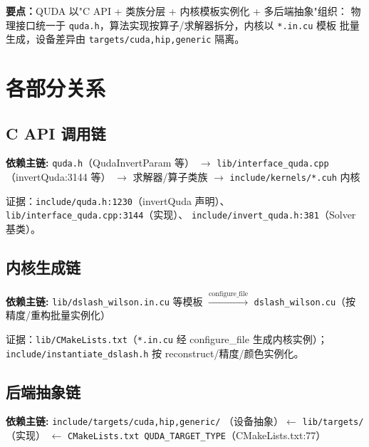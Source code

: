 \documentclass[UTF8]{ctexart}
\begin{document}
\begin{keybox}
\textbf{要点：}QUDA 以"C API + 类族分层 + 内核模板实例化 + 多后端抽象"组织：
物理接口统一于 \texttt{quda.h}，算法实现按算子/求解器拆分，内核以 \texttt{*.in.cu} 模板
批量生成，设备差异由 \texttt{targets/{cuda,hip,generic}} 隔离。
\end{keybox}

\section{各部分关系}

\subsection{C API 调用链}
\begin{keybox}
\textbf{依赖主链:} \textcolor{relation}{\texttt{quda.h}（QudaInvertParam 等）
$\rightarrow$ \nolinkurl{lib/interface_quda.cpp}（invertQuda:3144 等）
$\rightarrow$ 求解器/算子类族 $\rightarrow$ \nolinkurl{include/kernels/*.cuh} 内核}
\end{keybox}
证据：\nolinkurl{include/quda.h:1230}（invertQuda 声明）、
\nolinkurl{lib/interface_quda.cpp:3144}（实现）、
\nolinkurl{include/invert_quda.h:381}（Solver 基类）。

\subsection{内核生成链}
\begin{keybox}
\textbf{依赖主链:} \textcolor{relation}{\nolinkurl{lib/dslash_wilson.in.cu} 等模板
$\xrightarrow{\text{configure\_file}}$ \nolinkurl{dslash_wilson.cu}（按精度/重构批量实例化）}
\end{keybox}
证据：\nolinkurl{lib/CMakeLists.txt}（\texttt{*.in.cu} 经 configure\_file 生成内核实例）；
\nolinkurl{include/instantiate_dslash.h} 按 reconstruct/精度/颜色实例化。

\subsection{后端抽象链}
\begin{keybox}
\textbf{依赖主链:} \textcolor{relation}{\texttt{include/targets/{cuda,hip,generic}/}
（设备抽象）$\leftarrow$ \texttt{lib/targets/}（实现）
$\leftarrow$ \nolinkurl{CMakeLists.txt QUDA_TARGET_TYPE}（CMakeLists.txt:77）}
\end{keybox}
\end{document}
